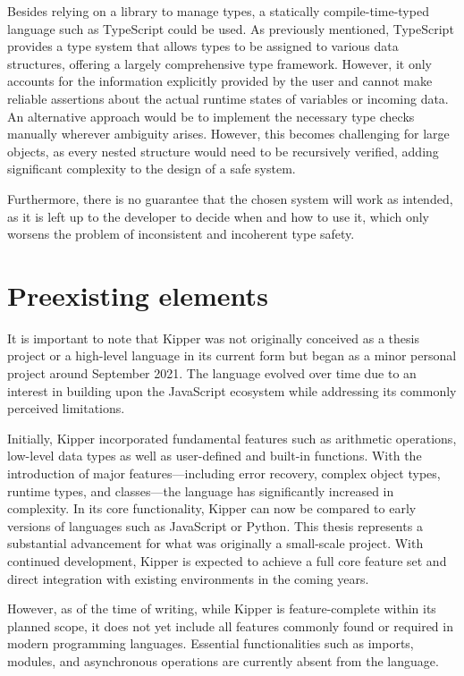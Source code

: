 Besides relying on a library to manage types, a statically compile-time-typed language such as TypeScript could be used. As previously mentioned, TypeScript provides a type system that allows types to be assigned to various data structures, offering a largely comprehensive type framework. However, it only accounts for the information explicitly provided by the user and cannot make reliable assertions about the actual runtime states of variables or incoming data. An alternative approach would be to implement the necessary type checks manually wherever ambiguity arises. However, this becomes challenging for large objects, as every nested structure would need to be recursively verified, adding significant complexity to the design of a safe system.

Furthermore, there is no guarantee that the chosen system will work as intended, as it is left up to the developer to decide when and how to use it, which only worsens the problem of inconsistent and incoherent type safety.

\section{Preexisting elements}

It is important to note that Kipper was not originally conceived as a thesis project or a high-level language in its current form but began as a minor personal project around September 2021. The language evolved over time due to an interest in building upon the JavaScript ecosystem while addressing its commonly perceived limitations.

Initially, Kipper incorporated fundamental features such as arithmetic operations, low-level data types as well as user-defined and built-in functions. With the introduction of major features—including error recovery, complex object types, runtime types, and classes—the language has significantly increased in complexity. In its core functionality, Kipper can now be compared to early versions of languages such as JavaScript or Python. This thesis represents a substantial advancement for what was originally a small-scale project. With continued development, Kipper is expected to achieve a full core feature set and direct integration with existing environments in the coming years.

However, as of the time of writing, while Kipper is feature-complete within its planned scope, it does not yet include all features commonly found or required in modern programming languages. Essential functionalities such as imports, modules, and asynchronous operations are currently absent from the language.


